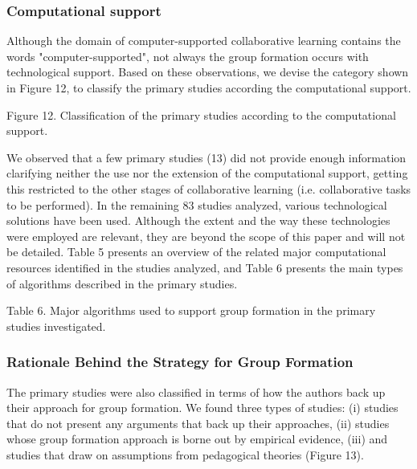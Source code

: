 \subsubsection{Computational support}

Although the domain of computer-supported collaborative learning contains the words "computer-supported", not always the group formation occurs with technological support. Based on these observations, we devise the category shown in Figure 12, to classify the primary studies according the computational support. 

Figure 12. Classification of the primary studies according to the computational support.

We observed that a few primary studies (13) did not provide enough information clarifying neither the use nor the extension of the computational support, getting this restricted to the other stages of collaborative learning (i.e. collaborative tasks to be performed). In the remaining 83 studies analyzed, various technological solutions have been used. Although the extent and the way these technologies were employed are relevant, they are beyond the scope of this paper and will not be detailed. Table 5 presents an overview of the related major computational resources identified in the studies analyzed, and Table 6 presents the main types of algorithms described in the primary studies. 

Table 6. Major algorithms used to support group formation in the primary studies investigated.

\subsubsection{Rationale Behind the Strategy for Group Formation}

The primary studies were also classified in terms of how the authors back up their approach for group formation. We found three types of studies: (i) studies that do not present any arguments that back up their approaches, (ii) studies whose group formation approach is borne out by empirical evidence, (iii) and studies that draw on assumptions from pedagogical theories (Figure 13). 
 
